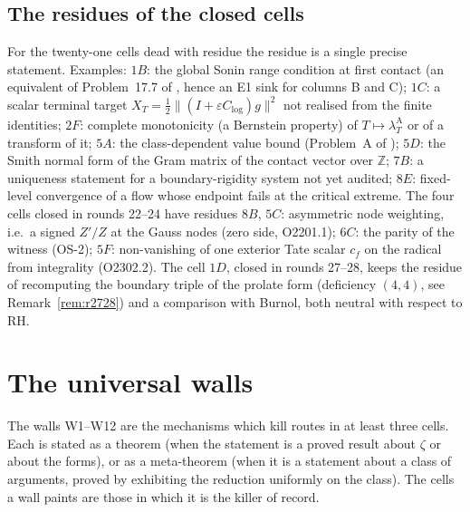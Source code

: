 \documentclass[11pt]{amsart}
\theoremstyle{definition}
\theoremstyle{remark}
\newcommand{\Z}{\mathbb Z}
\newcommand{\lamA}{\lambda^{\mathrm A}_T}
\begin{document}
\subsection{The residues of the closed cells}
For the twenty-one cells dead with residue the residue is a single precise statement. Examples:
$1B$: the global Sonin range condition at first contact (an equivalent of Problem~17.7 of
\cite{Paper47}, hence an E1 sink for columns B and C); $1C$: a scalar terminal target
$X_T=\frac12\|(I+\varepsilon C_{\log})g\|^2$ not realised from the finite identities; $2F$: complete
monotonicity (a Bernstein property) of $T\mapsto\lamA$ or of a transform of it; $5A$: the class-dependent
value bound (Problem~A of \cite{Paper47}); $5D$: the Smith normal form of the Gram matrix of the contact
vector over $\Z$; $7B$: a uniqueness statement for a boundary-rigidity system not yet audited;
$8E$: fixed-level convergence of a flow whose endpoint fails at the critical extreme. The four cells
closed in rounds 22--24 have residues $8B$, $5C$: asymmetric node weighting, i.e.\ a signed $Z'/Z$ at the
Gauss nodes (zero side, O2201.1); $6C$: the parity of the witness (OS-2); $5F$: non-vanishing of one
exterior Tate scalar $c_f$ on the radical from integrality (O2302.2). The cell $1D$, closed in rounds 27--28, keeps the residue of recomputing the boundary triple of the prolate form (deficiency $(4,4)$, see Remark~\ref{rem:r2728}) and a comparison with Burnol, both neutral with respect to RH.

\section{The universal walls}\label{sec:walls}

The walls W1--W12 are the mechanisms which kill routes in at least three cells. Each is stated as a
theorem (when the statement is a proved result about $\zeta$ or about the forms), or as a meta-theorem
(when it is a statement about a class of arguments, proved by exhibiting the reduction uniformly on the
class). The cells a wall paints are those in which it is the killer of record.
\end{document}
